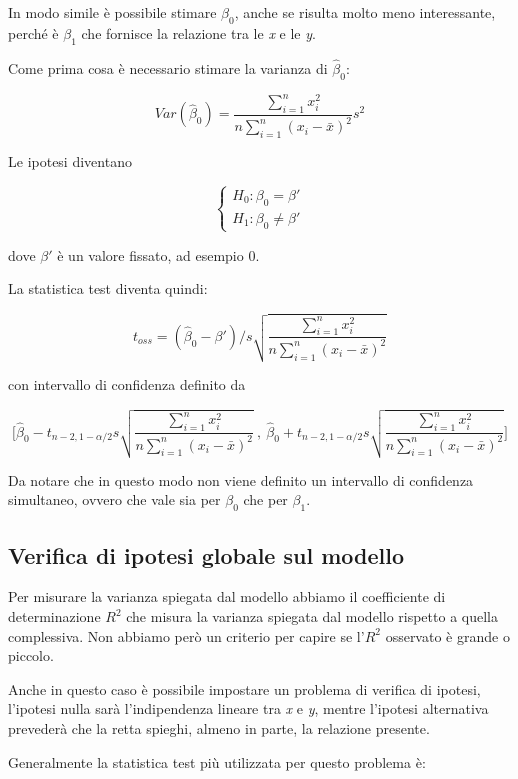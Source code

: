 In modo simile è possibile stimare $ \beta_0 $, anche se risulta molto meno
interessante, perché è $ \beta_1 $ che fornisce la relazione tra le \emph{x} e
le \emph{y}.

Come prima cosa è necessario stimare la varianza di $ \hat{\beta}_0 $:

$$
Var(\hat{\beta}_0) = \frac{\sum_{i=1}^{n} x_{i}^2}{n \sum_{i=1}^{n} (x_i - \bar{x})^2}s^2
$$

Le ipotesi diventano

$$
\begin{cases}
H_0 : \beta_0 = \beta' \\
H_1 : \beta_0 \neq \beta' 
\end{cases}
$$

dove $ \beta' $ è un valore fissato, ad esempio 0.

La statistica test diventa quindi:

$$
t_{oss}  = (\hat{\beta}_0 - \beta') \Bigg/ s \sqrt{\frac{\sum_{i=1}^{n} x_{i}^2}{n \sum_{i=1}^{n} (x_i - \bar{x})^2}}
$$

con intervallo di confidenza definito da

$$
\Bigg[ \hat{\beta}_0 - t_{n-2, 1-\alpha/2} s \sqrt{\frac{\sum_{i=1}^{n} x_{i}^2}{n \sum_{i=1}^{n} (x_i - \bar{x})^2}} \:,\: \hat{\beta}_0 + t_{n-2, 1-\alpha/2} s \sqrt{\frac{\sum_{i=1}^{n} x_{i}^2}{n \sum_{i=1}^{n} (x_i - \bar{x})^2}}\Bigg]
$$

Da notare che in questo modo non viene definito un intervallo di confidenza simultaneo, ovvero che vale sia per $ \beta_0 $ che per $ \beta_1 $.


\subsection{Verifica di ipotesi globale sul modello}\label{verifica-di-ipotesi-globale-sul-modello}

Per misurare la varianza spiegata dal modello abbiamo il coefficiente di
determinazione $R^2$ che misura la varianza spiegata dal modello
rispetto a quella complessiva. Non abbiamo però un criterio per capire
se l'$R^{2}$ osservato è grande o piccolo.

Anche in questo caso è possibile impostare un problema di verifica di
ipotesi, l'ipotesi nulla sarà l'indipendenza lineare tra \emph{x} e
\emph{y}, mentre l'ipotesi alternativa prevederà che la retta spieghi,
almeno in parte, la relazione presente.

Generalmente la statistica test più utilizzata per questo problema è:

